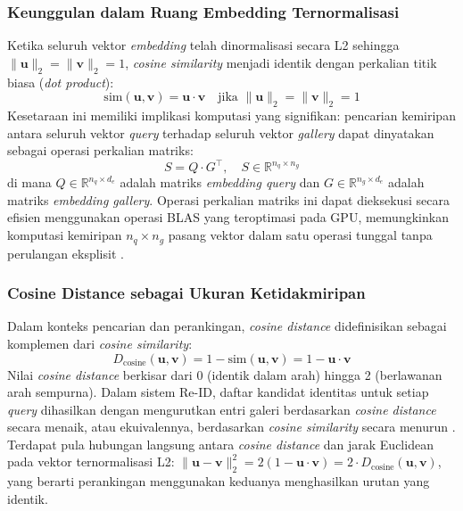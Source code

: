 \subsubsection{Keunggulan dalam Ruang Embedding Ternormalisasi}
 
Ketika seluruh vektor \textit{embedding} telah dinormalisasi secara L2 sehingga $\|\mathbf{u}\|_2 = \|\mathbf{v}\|_2 = 1$, \textit{cosine similarity} menjadi identik dengan perkalian titik biasa (\textit{dot product}):
\begin{equation}
    \text{sim}(\mathbf{u}, \mathbf{v}) = \mathbf{u} \cdot \mathbf{v}
    \quad \text{jika } \|\mathbf{u}\|_2 = \|\mathbf{v}\|_2 = 1
\end{equation}
Kesetaraan ini memiliki implikasi komputasi yang signifikan: pencarian kemiripan antara seluruh vektor \textit{query} terhadap seluruh vektor \textit{gallery} dapat dinyatakan sebagai operasi perkalian matriks:
\begin{equation}
    S = Q \cdot G^\top, \quad S \in \mathbb{R}^{n_q \times n_g}
\end{equation}
di mana $Q \in \mathbb{R}^{n_q \times d_e}$ adalah matriks \textit{embedding query} dan $G \in \mathbb{R}^{n_g \times d_e}$ adalah matriks \textit{embedding gallery}. Operasi perkalian matriks ini dapat dieksekusi secara efisien menggunakan operasi BLAS yang teroptimasi pada GPU, memungkinkan komputasi kemiripan $n_q \times n_g$ pasang vektor dalam satu operasi tunggal tanpa perulangan eksplisit \cite{manning2008introduction}.
 
\subsubsection{Cosine Distance sebagai Ukuran Ketidakmiripan}
 
Dalam konteks pencarian dan perankingan, \textit{cosine distance} didefinisikan sebagai komplemen dari \textit{cosine similarity}:
\begin{equation}
    D_{\text{cosine}}(\mathbf{u}, \mathbf{v})
    = 1 - \text{sim}(\mathbf{u}, \mathbf{v})
    = 1 - \mathbf{u} \cdot \mathbf{v}
\end{equation}
Nilai \textit{cosine distance} berkisar dari 0 (identik dalam arah) hingga 2 (berlawanan arah sempurna). Dalam sistem Re-ID, daftar kandidat identitas untuk setiap \textit{query} dihasilkan dengan mengurutkan entri galeri berdasarkan \textit{cosine distance} secara menaik, atau ekuivalennya, berdasarkan \textit{cosine similarity} secara menurun \cite{zheng2015scalable}. Terdapat pula hubungan langsung antara \textit{cosine distance} dan jarak Euclidean pada vektor ternormalisasi L2: $\|\mathbf{u} - \mathbf{v}\|_2^2 = 2(1 - \mathbf{u} \cdot \mathbf{v}) = 2 \cdot D_{\text{cosine}}(\mathbf{u}, \mathbf{v})$, yang berarti perankingan menggunakan keduanya menghasilkan urutan yang identik.

